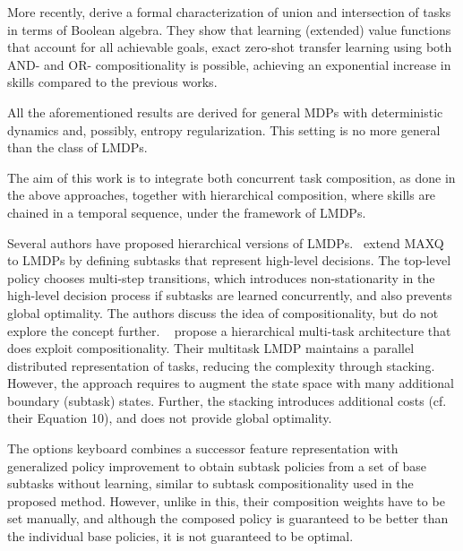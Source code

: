 More recently, \citep{NangueTasse2020} derive a formal characterization of union and intersection of tasks in terms of Boolean algebra. They show that learning (extended) value functions that account for all achievable goals, exact zero-shot transfer learning using both AND- and OR- compositionality is possible, achieving an exponential increase in skills compared to the previous works.

All the aforementioned results are derived for general MDPs with deterministic dynamics and, possibly, entropy regularization. This setting is no more general than the class of LMDPs.


The aim of this work is to integrate both concurrent task composition, as done in the above approaches, together with hierarchical composition, where skills are chained in a temporal sequence, under the framework of LMDPs.

Several authors have proposed hierarchical versions of LMDPs.~\cite{Jonsson2016} extend MAXQ~\citep{Dietterich2000} to LMDPs by defining subtasks that represent high-level decisions. The top-level policy chooses multi-step transitions, which introduces non-stationarity in the high-level decision process if subtasks are learned concurrently, and also prevents global optimality. The authors discuss the idea of compositionality, but do not explore the concept further.
~\citet{Saxe2017} propose a hierarchical multi-task architecture that does exploit compositionality. Their multitask LMDP maintains a parallel distributed representation of tasks, reducing the complexity through stacking. However, the approach requires to augment the state space with many additional boundary (subtask) states. Further, the stacking introduces additional costs (cf. their Equation 10), and does not provide global optimality.

The options keyboard \citep{Barreto2019} combines a successor feature representation with generalized policy improvement to obtain subtask policies from a set of base subtasks without learning, similar to subtask compositionality used in the proposed method. However, unlike in this, their composition weights have to be set manually, and although the composed policy is guaranteed to be better than the individual base policies, it is not guaranteed to be optimal.

